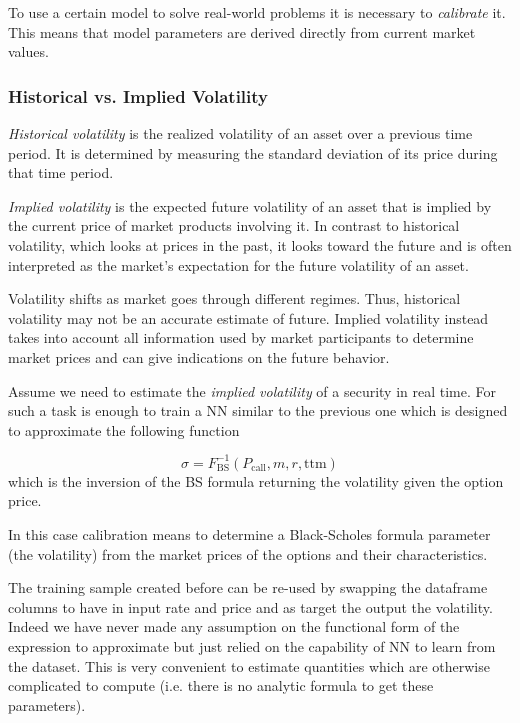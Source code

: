 To use a certain model to solve real-world problems it is necessary to \emph{calibrate} it. This means that model parameters are derived directly from current market values. 

\begin{attention}
\subsubsection{Historical vs. Implied Volatility}
\label{historical-vs.-implied-volatility}
	
\emph{Historical volatility} is the realized volatility of an asset over a previous time period. It is determined by measuring the standard deviation of its price during that time period.
	
\emph{Implied volatility} is the expected future volatility of an asset that is implied by the current price of market products involving it.
In contrast to historical volatility, which looks at prices in the past, it looks toward the future and is often interpreted as the market's expectation for the future volatility of an asset.
	
Volatility shifts as market goes through different regimes. Thus, historical volatility may not be an accurate estimate of future. Implied volatility instead takes into account all information used by market participants to determine market prices and can give indications on the future behavior.
\end{attention}

Assume we need to estimate the \emph{implied volatility} of a security in real time. For such a task is enough to train a NN similar to the previous one which is designed to approximate the following function

\begin{equation} 
\sigma = F^{-1}_\textrm{BS}(P_\textrm{call}, m, r, \mathrm{ttm})
\end{equation}
\noindent
which is the inversion of the BS formula returning the volatility given the option price.

In this case calibration means to determine a Black-Scholes formula parameter (the volatility) from the market prices of the options and their characteristics.

The training sample created before can be re-used by swapping the dataframe columns to have in input rate and price and as target the output the volatility. 
Indeed we have never made any assumption on the functional form of the expression to approximate but just relied on the capability of NN to learn from the dataset.
This is very convenient to estimate quantities which are otherwise complicated to compute (i.e. there is no analytic formula to get these parameters).
 
